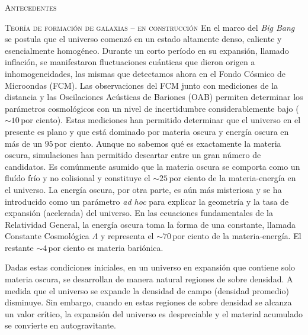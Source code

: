 \documentclass[xcolor=dvipsnames,4pt,hyperref={colorlinks,citecolor=black,linkcolor=black,urlcolor=black}]{beamer}
\begin{document}
\begin{frame}[allowframebreaks]{\textsc{Antecedentes}}
%
\end{frame}

\begin{frame}[allowframebreaks]{\textsc{Teoría de formación de galaxias -- en construcción}}
%
En el marco del \emph{Big Bang} se postula que el universo comenzó en un estado altamente denso,
caliente y esencialmente homogéneo. Durante un corto período en su expansión, llamado inflación, se
manifestaron fluctuaciones cuánticas que dieron origen a inhomogeneidades, las mismas que detectamos
ahora en el Fondo Cósmico de Microondas (FCM). Las observaciones del FCM junto con mediciones de la
distancia y las Oscilaciones Acústicas de Bariones (OAB) permiten determinar los parámetros
cosmológicos con un nivel de incertidumbre considerablemente bajo ($\sim10\,$por ciento). Estas
mediciones han permitido determinar que el universo en el presente es plano y que está dominado por
materia oscura y energía oscura en más de un $95\,$por ciento. Aunque no sabemos qué es exactamente
la materia oscura, simulaciones han permitido descartar entre un gran número de candidatos. Es
comúnmente asumido que la materia oscura se comporta como un fluído frío y no colisional y
constituye el $\sim25\,$por ciento de la materia-energía en el universo. La energía oscura, por otra
parte, es aún más misteriosa y se ha introducido como un parámetro \emph{ad hoc} para explicar la
geometría y la tasa de expansión (acelerada) del universo. En las ecuaciones fundamentales de la
Relatividad General, la energía oscura toma la forma de una constante, llamada Constante Cosmológica
$\Lambda$ y representa el $\sim70\,$por ciento de la materia-energía. El restante $\sim4\,$por
ciento es materia bariónica.

Dadas estas condiciones iniciales, en un universo en expansión que contiene solo materia oscura, se
desarrollan de manera natural regiones de sobre densidad. A medida que el universo se expande la
densidad de campo (densidad promedio) disminuye. Sin embargo, cuando en estas regiones de sobre
densidad se alcanza un valor crítico, la expansión del universo es despreciable y el material
acumulado se convierte en autogravitante.


\end{frame}
\end{document}
